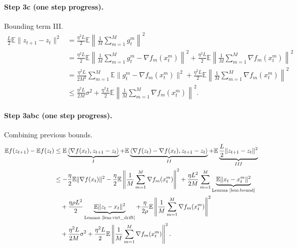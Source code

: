 \paragraph{Step 3c (one step progress).} Bounding term III.
\begin{align*}
\frac{L}{2}\mathbb{E}\|z_{t+1} - z_t\|^2
&= \frac{\eta^2 L}{2}\mathbb{E}\left\|\frac{1}{M}\sum_{m=1}^{M} g_t^m\right\|^2 \\
&= \frac{\eta^2 L}{2}\mathbb{E}\left\|\frac{1}{M}\sum_{m=1}^{M} g_t^m - \nabla f_m(x_t^m)\right\|^2
  + \frac{\eta^2 L}{2}\mathbb{E}\left\|\frac{1}{M}\sum_{m=1}^{M}\nabla f_m(x_t^m)\right\|^2 \\
&= \frac{\eta^2 L}{2M^2}\sum_{m=1}^{M}\mathbb{E}\|g_t^m - \nabla f_m(x_t^m)\|^2
  + \frac{\eta^2 L}{2}\mathbb{E}\left\|\frac{1}{M}\sum_{m=1}^{M}\nabla f_m(x_t^m)\right\|^2 \\
&\leq \frac{\eta^2 L}{2M}\sigma^2
  + \frac{\eta^2 L}{2}\mathbb{E}\left\|\frac{1}{M}\sum_{m=1}^{M}\nabla f_m(x_t^m)\right\|^2.
\end{align*}

\paragraph{Step 3abc (one step progress).} Combining previous bounds.
\begin{align*}
\mathbb{E}f(z_{t+1}) - \mathbb{E}f(z_t)
&\leq \mathbb{E}\underbrace{\langle \nabla f(x_t), z_{t+1} - z_t \rangle}_{I}
  + \mathbb{E}\underbrace{\langle \nabla f(z_t) - \nabla f(x_t), z_{t+1} - z_t \rangle}_{II}
  + \mathbb{E}\underbrace{\frac{L}{2}\|z_{t+1} - z_t\|^2}_{III} \\
&\leq -\frac{\eta}{2}\mathbb{E}\|\nabla f(x_t)\|^2
  -\frac{\eta}{2}\mathbb{E}\left\|\frac{1}{M}\sum_{m=1}^{M}\nabla f_m(x_t^m)\right\|^2
  +\frac{\eta L^2}{2M}\sum_{m=1}^{M}\underbrace{\mathbb{E}\|x_t - x_t^m\|^2}_{\text{Lemma~\ref{lem:bound}}} \\
&\quad +\frac{\eta\rho L^2}{2}\underbrace{\mathbb{E}\|z_t - x_t\|^2}_{\text{Lemma~\ref{lem:virt_drift}}}
  +\frac{\eta}{2\rho}\mathbb{E}\left\|\frac{1}{M}\sum_{m=1}^{M}\nabla f_m(x_t^m)\right\|^2 \\
&\quad +\frac{\eta^2 L}{2M}\sigma^2
  + \frac{\eta^2 L}{2}\mathbb{E}\left\|\frac{1}{M}\sum_{m=1}^{M}\nabla f_m(x_t^m)\right\|^2.
\end{align*}

